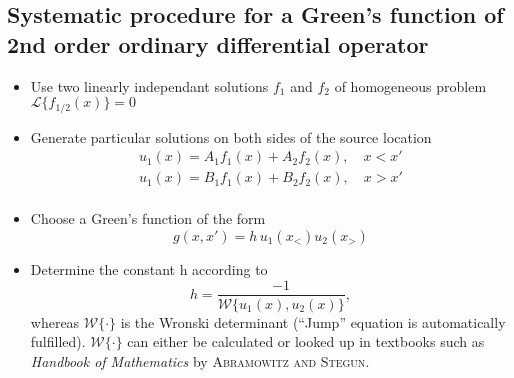 \subsection{Systematic procedure for a Green's function of 2nd order ordinary differential operator}
\begin{itemize}
  \item Use two linearly independant solutions $f_1$ and $f_2$ of homogeneous problem \(\mathcal{L}\{f_{1/2}(x)\} = 0\)
  \item Generate particular solutions on both sides of the source location
        \begin{align*}
          u_{1}(x) = A_{1} f_{1}(x) + A_{2} f_{2}(x), \quad x < x'\\
          u_{1}(x) = B_{1} f_{1}(x) + B_{2} f_{2}(x), \quad x > x'\\
        \end{align*}
  \item Choose a Green's function of the form
        \begin{equation*}
          g(x, x') = h \, u_{1}(x_{<})u_{2}(x_{>})
        \end{equation*}
  \item Determine the constant h according to
        \begin{equation*}
          h = \dfrac{-1}{\mathcal{W}\{u_{1}(x), u_{2}(x)\}},
        \end{equation*}
        whereas $\mathcal{W}\{\cdot\}$ is the Wronski determinant (``Jump'' equation is automatically fulfilled). $\mathcal{W}\{\cdot\}$ can either be calculated or looked up in textbooks such as \textit{Handbook of Mathematics} by \textsc{Abramowitz and Stegun}.
\end{itemize}
